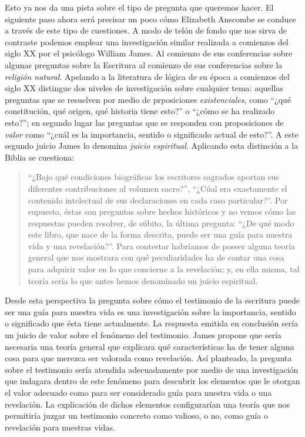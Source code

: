 Esto ya nos da una pista sobre el tipo de pregunta que queremos hacer. El
siguiente paso ahora será precisar un poco cómo Elizabeth Anscombe se conduce a
través de este tipo de cuestiones. A modo de telón de fondo que nos sirva de
contraste podemos emplear una investigación similar realizada a comienzos del
siglo XX por el psicólogo William James.
Al comienzo de sus conferencias sobre
algunas preguntas sobre la Escritura al comienzo de sus conferencias sobre la
\emph{religión natural}. Apelando a la literatura de lógica de su época a
comienzos del siglo XX distingue dos niveles de investigación sobre cualquier
tema: aquellas preguntas que se resuelven por medio de prposiciones
\emph{existenciales}, como \enquote{¿qué constitución, qué origen, qué historia
  tiene esto?} o \enquote{¿cómo se ha realizado esto?}; en segundo lugar las
preguntas que se responden con proposiciones de \emph{valor} como \enquote{¿cuál
  es la importancia, sentido o significado actual de esto?}. A este segundo
juicio James lo denomina \emph{juicio espiritual}. Aplicando esta distinción a
la Biblia se cuestiona:

\blockquote[{\cite[27]{james2002variedades}}]{\enquote{¿Bajo qué condiciones
    biográficas los escritores sagrados aportan sus diferentes contribuciones al
    volumen sacro?}, \enquote{¿Cúal era exactamente el contenido intelectual de
    sus declaraciones en cada caso particular?}. Por supuesto, éstas son
  preguntas sobre hechos históricos y no vemos cómo las respuestas pueden
  resolver, de súbito, la última pregunta: \enquote{¿De qué modo este libro, que
    nace de la forma descrita, puede ser una guía para nuestra vida y una
    revelación?}. Para contestar habríamos de poseer alguna teoría general que
  nos mostrara con qué peculiaridades ha de contar una cosa para adquirir valor
  en lo que concierne a la revelación; y, en ella misma, tal teoría sería lo que
  antes hemos denominado un juicio espiritual.}

Desde esta perspectiva la pregunta sobre cómo el testimonio de la escritura
puede ser una guía para nuestra vida es una investigación sobre la importancia,
sentido o significado que ésta tiene actualmente. La respuesta emitida en
conclusión sería un juicio de valor sobre el fenómeno del testimonio. James
propone que sería necesaria una teoría general que explicara qué características
ha de tener alguna cosa para que merezca ser valorada como revelación. Así
planteado, la pregunta sobre el testimonio sería atendida adecuadamente por
medio de una investigación que indagara dentro de este fenómeno para descubrir
los elementos que le otorgan el valor adecuado como para ser considerado guía
para nuestra vida o una revelación. La explicación de dichos elementos
configurarían una teoría que nos permitiría juzgar un testimonio concreto como
valioso, o no, como guía o revelación para nuestras vidas.

